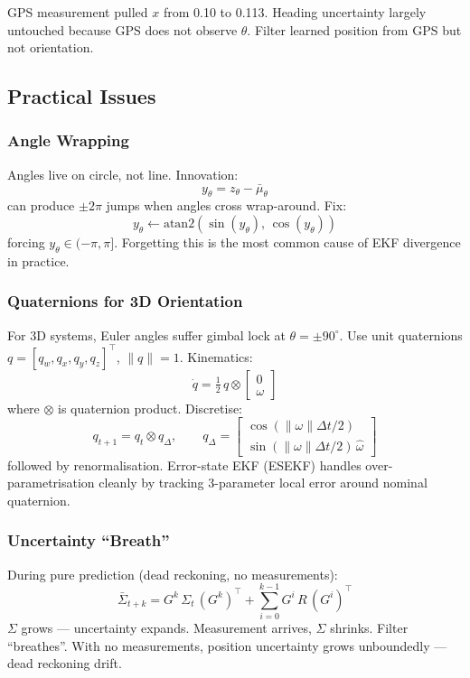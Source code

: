 \documentclass[11pt,a4paper]{article}
\begin{document}
GPS measurement pulled $x$ from 0.10 to 0.113. Heading uncertainty largely untouched because GPS does not observe $\theta$. Filter learned position from GPS but not orientation.

\subsection{Practical Issues}

\subsubsection{Angle Wrapping}

Angles live on circle, not line. Innovation:
\[
y_\theta = z_\theta - \bar{\mu}_\theta
\]
can produce $\pm 2\pi$ jumps when angles cross wrap-around. Fix:
\[
y_\theta \leftarrow \mathrm{atan2}(\sin(y_\theta),\, \cos(y_\theta))
\]
forcing $y_\theta \in (-\pi, \pi]$. Forgetting this is the most common cause of EKF divergence in practice.

\subsubsection{Quaternions for 3D Orientation}

For 3D systems, Euler angles suffer gimbal lock at $\theta = \pm 90^\circ$. Use unit quaternions $q = [q_w, q_x, q_y, q_z]^\top$, $\|q\| = 1$. Kinematics:
\[
\dot{q} = \tfrac{1}{2}\, q \otimes \begin{bmatrix}0 \\ \omega\end{bmatrix}
\]
where $\otimes$ is quaternion product. Discretise:
\[
q_{t+1} = q_t \otimes q_\Delta, \qquad q_\Delta = \begin{bmatrix}\cos(\|\omega\|\Delta t/2) \\ \sin(\|\omega\|\Delta t/2)\,\hat{\omega}\end{bmatrix}
\]
followed by renormalisation. Error-state EKF (ESEKF) handles over-parametrisation cleanly by tracking 3-parameter local error around nominal quaternion.

\subsubsection{Uncertainty ``Breath''}

During pure prediction (dead reckoning, no measurements):
\[
\bar{\Sigma}_{t+k} = G^k\, \Sigma_t\, (G^k)^\top + \sum_{i=0}^{k-1} G^i\, R\, (G^i)^\top
\]
$\Sigma$ grows --- uncertainty expands. Measurement arrives, $\Sigma$ shrinks. Filter ``breathes''. With no measurements, position uncertainty grows unboundedly --- dead reckoning drift.
\end{document}
